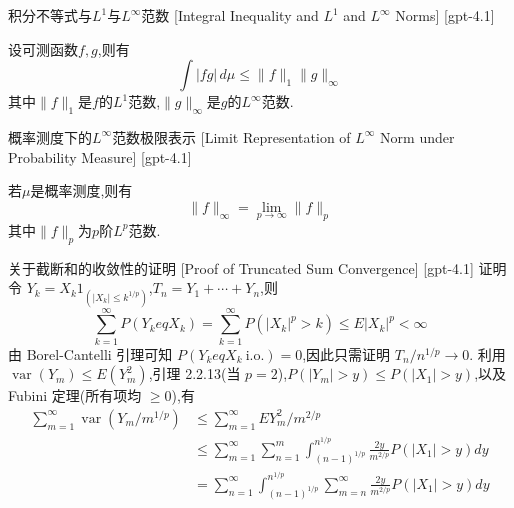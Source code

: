 \documentclass[UTF8]{ctexart}
\begin{document}
    
    
    \begin{thm}
        {积分不等式与$L^1$与$L^\infty$范数}
        [Integral Inequality and $L^1$ and $L^\infty$ Norms]
        [gpt-4.1]
        
设可测函数$f, g$,则有
\[
\int |fg| \, d\mu \leq \| f \|_{1} \| g \|_{\infty}
\]
其中$\| f \|_{1}$是$f$的$L^1$范数,$\| g \|_{\infty}$是$g$的$L^\infty$范数.

    \end{thm}
    
    
    
    \begin{thm}
        {概率测度下的$L^\infty$范数极限表示}
        [Limit Representation of $L^\infty$ Norm under Probability Measure]
        [gpt-4.1]
        
若$\mu$是概率测度,则有
\[
\| f \|_{\infty} = \lim_{p \to \infty} \| f \|_{p}
\]
其中$\| f \|_{p}$为$p$阶$L^p$范数.

    \end{thm}
    
    
    
    \begin{prf}
        {关于截断和的收敛性的证明}
        [Proof of Truncated Sum Convergence]
        [gpt-4.1]
        证明 令 $Y_{k} = X_{k} 1_{(|X_{k}| \leq k^{1/p})}$,$T_{n} = Y_{1} + \cdots + Y_{n}$,则
\[
\sum_{k=1}^{\infty} P(Y_{k} 
eq X_{k}) = \sum_{k=1}^{\infty} P(|X_{k}|^{p} > k) \leq E |X_{k}|^{p} < \infty
\]
由 Borel-Cantelli 引理可知 $P(Y_{k} 
eq X_{k}~\text{i.o.}) = 0$,因此只需证明 $T_{n} / n^{1/p} \to 0$.
利用 $\operatorname{var}(Y_{m}) \leq E(Y_{m}^{2})$,引理 2.2.13(当 $p = 2$),$P(|Y_{m}| > y) \leq P(|X_{1}| > y)$,以及 Fubini 定理(所有项均 $\geq 0$),有
\[
\begin{array}{rl}
\sum_{m=1}^{\infty} \operatorname{var}(Y_{m} / m^{1/p}) & \leq \sum_{m=1}^{\infty} E Y_{m}^{2} / m^{2/p} \\
& \leq \sum_{m=1}^{\infty} \sum_{n=1}^{m} \int_{(n-1)^{1/p}}^{n^{1/p}} \frac{2y}{m^{2/p}} P(|X_{1}| > y) dy \\
& = \sum_{n=1}^{\infty} \int_{(n-1)^{1/p}}^{n^{1/p}} \sum_{m=n}^{\infty} \frac{2y}{m^{2/p}} P(|X_{1}| > y) dy
\end{array}
\]

    \end{prf}
    
\end{document}
